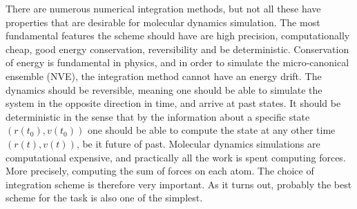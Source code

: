 \documentclass[twoside,english]{uiofysmaster}
\begin{document}
There are numerous numerical integration methods, but not all these have properties that are desirable for molecular dynamics simulation. 
The most fundamental features the scheme should have are high precision, computationally cheap, good energy conservation, reversibility and be deterministic.
Conservation of energy is fundamental in physics, and in order to simulate the micro-canonical ensemble (NVE), the integration method cannot have an energy drift.
The dynamics should be reversible, meaning one should be able to simulate the system in the opposite direction in time, and arrive at past states.
It should be deterministic in the sense that by the information about a specific state $(r(t_0), v(t_0))$ one should be able to compute the state at any other time $(r(t), v(t))$, be it future of past.
Molecular dynamics simulations are computational expensive, and practically all the work is spent computing forces. 
More precisely, computing the sum of forces on each atom. 
The choice of integration scheme is therefore very important. 
As it turns out, probably the best scheme for the task is also one of the simplest. 
\end{document}
